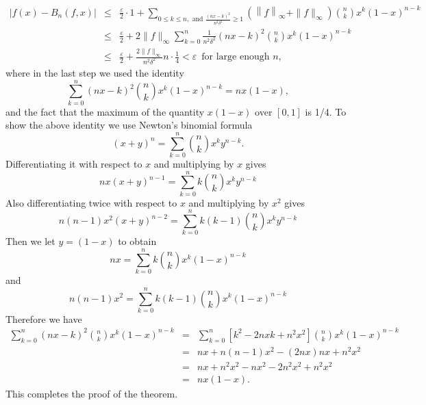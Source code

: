 \documentclass[12pt]{report}
\begin{document}
\begin{eqnarray*}
|f(x) - B_n(f, x)| 
&\le & \frac{\varepsilon}{2} \cdot  1+ \sum_{0 \le k \le n, \text{ and }
\frac{(nx-k)^2}{n^2\delta^2} \ge 1} \left ( \left \|f\right \|_\infty +
\|f\|_\infty \right ) \binom nk x^k(1-x)^{n-k}\\
&\le & \frac{\varepsilon}{2} + 2\|f\|_\infty \sum^n_{k=0}
\frac{1}{n^2\delta^2} (nx-k)^2 \binom nk x^k (1-x)^{n-k}\\
&\le& \frac{\varepsilon}{2} + \frac{2\|f\|_\infty}{n^2\delta^2} n \cdot
\frac{1}{4} < \varepsilon\, \mbox{ for large enough } n,
\end{eqnarray*}
where in the last step we used the identity
\[
\sum^n_{k=0} (nx-k)^2 \binom nk x^k (1-x)^{n-k}= nx(1-x),
\]
and the fact that the maximum of the quantity $x(1-x)$  over $[0, 1]$
is 1/4.
To show the above identity we use Newton's binomial
formula
 \[
(x+y)^n = \displaystyle{\sum^n_{k=0} \binom nk x^k
y^{n-k}}.
\] 
Differentiating it with respect to $x$ and  multiplying  by $x$
gives
\[
nx(x+y)^{n-1} = \sum^n_{k=0} k \binom nk x^k y^{n-k}
\]
Also differentiating twice with respect to $x$ and  multiplying  
  by $x^2$ gives
\[
n(n-1) x^2(x+y)^{n-2} = \sum^n_{k=0} k(k-1) \binom nk x^k y^{n-k}
\]
Then we let  $y = (1-x)$ to obtain
\[
nx= \sum^n_{k=0} k \binom nk x^k (1-x)^{n-k}
\]
and
\[
n(n-1) x^2 = \sum^n_{k=0} k(k-1) \binom nk x^k (1-x)^{n-k}
\]
Therefore we have
\begin{eqnarray*}
\sum^n_{k=0} (nx-k)^2 \binom nk x^k (1-x)^{n-k} &=& \sum^n_{k=0}
[k^2 - 2nxk + n^2 x^2] \binom nk x^k (1-x)^{n-k}\\
&=& nx + n(n-1)x^2 - (2nx) nx + n^2x^2 \\
&=& nx + n^2x^2 - nx^2 - 2n^2x^2 + n^2 x^2\\
&=& nx(1-x).
\end{eqnarray*}
This completes the proof of the theorem.
\end{document}
